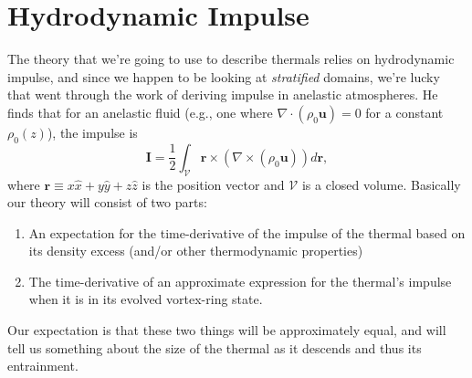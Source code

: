 \documentclass[onecolumn, amsmath, amsfonts, amssymb]{aastex62}
\newcommand{\Div}[1]{\ensuremath{\nabla\cdot\left( #1\right)}}
\begin{document}
\section{Hydrodynamic Impulse}
The theory that we're going to use to describe thermals relies on hydrodynamic impulse,
and since we happen to be looking at \emph{stratified} domains, we're lucky that
\citet{shivamoggi2010} went through the work of deriving impulse in anelastic atmospheres.
He finds that for an anelastic fluid (e.g., one where $\Div{\rho_0\bm{u}} = 0$ for 
a constant $\rho_0(z)$), the impulse is
\begin{equation}
\bm{I} = \frac{1}{2}\int_{\mathcal{V}} \bm{r}\times(\nabla\times(\rho_0\bm{u}))d\bm{r},
\label{eqn:impulse}
\end{equation}
where $\bm{r} \equiv x\hat{x} + y\hat{y} + z\hat{z}$ is the position vector and $\mathcal{V}$ is a closed volume.
Basically our theory will consist of two parts:
\begin{enumerate}
\item An expectation for the time-derivative of the impulse of the thermal based on its
density excess (and/or other thermodynamic properties)
\item The time-derivative of an approximate expression for the thermal's impulse when it is
in its evolved vortex-ring state.
\end{enumerate}
Our expectation is that these two things will be approximately equal, and will tell us something
about the size of the thermal as it descends and thus its entrainment.
\end{document}
